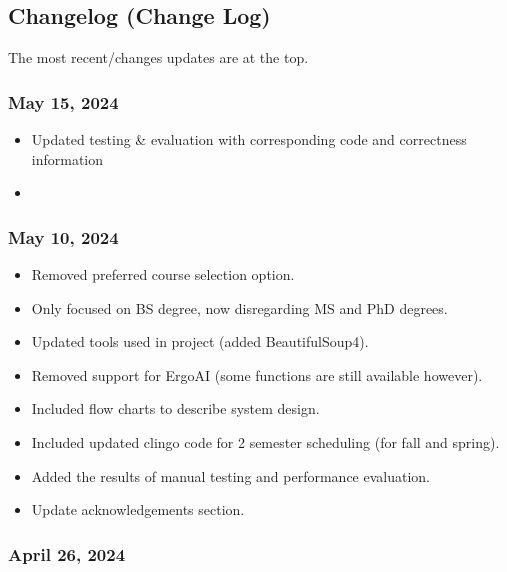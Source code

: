 \documentclass[12pt]{article}
\begin{document}
    \subsection{Changelog (Change Log)}
    \label{subsec:change}

    The most recent/changes updates are at the top.

    \subsubsection{May 15, 2024}

    \begin{itemize}
        \item Updated testing \& evaluation with corresponding code and correctness information
        \item 
    \end{itemize}

    \subsubsection{May 10, 2024}

    \begin{itemize}
        \item Removed preferred course selection option.
        \item Only focused on BS degree, now disregarding MS and PhD degrees.
        \item Updated tools used in project (added BeautifulSoup4).
        \item Removed support for ErgoAI (some functions are still available however).
        \item Included flow charts to describe system design.
        \item Included updated clingo code for 2 semester scheduling (for fall and spring).
        \item Added the results of manual testing and performance evaluation.
        \item Update acknowledgements section.
    \end{itemize}

    
    \subsubsection{April 26, 2024}
\end{document}
